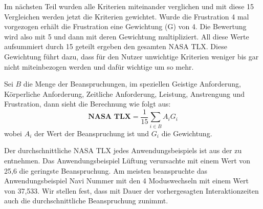 Im nächsten Teil wurden alle Kriterien miteinander verglichen und mit diese 15 Vergleichen werden jetzt die Kriterien gewichtet. Wurde die Frustration 4 mal vorgezogen erhält die Frustration eine Gewichtung (G) von 4. Die Bewertung wird also mit 5 und dann mit deren Gewichtung multipliziert. All diese Werte aufsummiert durch 15 geteilt ergeben den gesamten NASA TLX. Diese Gewichtung führt dazu, dass für den Nutzer unwichtige Kriterien weniger bis gar nicht miteinbezogen werden und dafür wichtige um so mehr. 

Sei $B$ die Menge der Beanspruchungen, im speziellen Geistige Anforderung, Körperliche Anforderung, Zeitliche Anforderung, Leistung, Anstrengung und Frustration, dann sieht die Berechnung wie folgt aus:
\[
\textbf{NASA TLX} =\frac{1}{15}\sum_{i \in B}A_{i}G_{i}
\]
wobei $A_i$ der Wert der Beanspruchung ist und $G_i$ die Gewichtung.

Der durchschnittliche NASA TLX jedes Anwendungsbeispiels ist aus der  zu entnehmen. Das Anwendungsbeispiel Lüftung verursachte mit einem Wert von 25,6 die geringste Beanspruchung. Am meisten beanspruchte das Anwendungsbeispiel Navi Nummer mit den 4 Moduswechseln mit einem Wert von 37,533.
Wir stellen fest, dass mit Dauer der vorhergesagten Interaktionzeiten auch die durchschnittliche Beanspruchung zunimmt.

